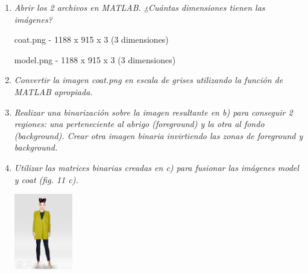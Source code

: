 \documentclass{article}
\begin{document}
\begin{enumerate}
 \begin{enumerate}
 \item \textit{Abrir los 2 archivos en MATLAB. ¿Cuántas dimensiones tienen las
imágenes?}

 coat.png - 1188 x 915 x 3 (3 dimensiones)

 model.png - 1188 x 915 x 3 (3 dimensiones)

 \item \textit{Convertir la imagen coat.png en escala de grises utilizando la función de
MATLAB apropiada.}

 \item \textit{Realizar una binarización sobre la imagen resultante en b) para conseguir
2 regiones: una perteneciente al abrigo (foreground) y la otra al fondo
(background). Crear otra imagen binaria invirtiendo las zonas de
foreground y background.}

 \item \textit{Utilizar las matrices binarias creadas en c) para fusionar las imágenes
model y coat (fig. 11 c).}

 \begin{center}
 \includegraphics[width=0.2\textwidth]{model_coat.jpg}
 \end{center}

 \end{enumerate}

\end{enumerate}
\end{document}
